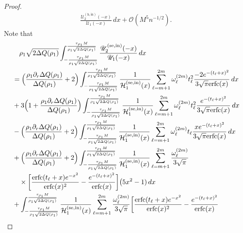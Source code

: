 \documentclass[a4paper]{article}
\newcommand{\erfc}{{\rm erfc}}
\numberwithin{equation}{section}
\begin{document}
\begin{proof}
\begin{align*}
\frac{\mathscr{U}_{2}^{(\mathrm{h},\mathrm{in})}(-x)}{\mathscr{U}_{1}(-x)}\,dx
+\mathcal{O}(M^5n^{-1/2}).
\end{align*}
Note that 
\begin{align*}
&\quad 
\rho_1\sqrt{2\Delta Q(\rho_1)}
\int_{-\frac{\tau_{\rho_1}M}{\rho_1\sqrt{2\Delta Q(\rho_1)}}}^{\frac{\tau_{\rho_1}M}{\rho_1\sqrt{2\Delta Q(\rho_1)}}}
\frac{\mathscr{U}_{2}^{(\mathrm{se},\mathrm{in})}(-x)}{\mathscr{U}_{1}(-x)}\,dx
\\
&=
\Bigl(\frac{\rho_1\partial_r\Delta Q(\rho_1)}{\Delta Q(\rho_1)}+2\Bigr)
\int_{-\frac{\tau_{\rho_1}M}{\rho_1\sqrt{2\Delta Q(\rho_1)}}}^{\frac{\tau_{\rho_1}M}{\rho_1\sqrt{2\Delta Q(\rho_1)}}}
\frac{1}{\mathcal{H}_1^{(\mathrm{se},\mathrm{in})}(x)}
\sum_{\ell=m+1}^{2m}\omega_{\ell}^{(2m)}t_{\ell}^2\frac{-2e^{-(t_{\ell}+x)^2}}{3\sqrt{\pi}\erfc(x)}
\,dx
\\
&
+
3\Bigl(1+\frac{\rho_1\partial_r\Delta Q(\rho_1)}{\Delta Q(\rho_1)}\Bigr)
\int_{-\frac{\tau_{\rho_1}M}{\rho_1\sqrt{2\Delta Q(\rho_1)}}}^{\frac{\tau_{\rho_1}M}{\rho_1\sqrt{2\Delta Q(\rho_1)}}}
\frac{1}{\mathcal{H}_1^{(\mathrm{se},\mathrm{in})}(x)}
\sum_{\ell=m+1}^{2m}\omega_{\ell}^{(2m)}t_{\ell}^2\frac{e^{-(t_{\ell}+x)^2}}{3\sqrt{\pi}\erfc(x)}
\,dx
\\
&
-%
\Bigl(\frac{\rho_1\partial_r\Delta Q(\rho_1)}{\Delta Q(\rho_1)}+2\Bigr)
\int_{-\frac{\tau_{\rho_1}M}{\rho_1\sqrt{2\Delta Q(\rho_1)}}}^{\frac{\tau_{\rho_1}M}{\rho_1\sqrt{2\Delta Q(\rho_1)}}}
\frac{1}{\mathcal{H}_1^{(\mathrm{se},\mathrm{in})}(x)}
\sum_{\ell=m+1}^{2m}\omega_{\ell}^{(2m)}t_{\ell}\frac{xe^{-(t_{\ell}+x)^2}}{3\sqrt{\pi}\erfc(x)}
\,dx
\\
&
+%
\Bigl(\frac{\rho_1\partial_r\Delta Q(\rho_1)}{\Delta Q(\rho_1)}+2\Bigr)
\int_{-\frac{\tau_{\rho_1}M}{\rho_1\sqrt{2\Delta Q(\rho_1)}}}^{\frac{\tau_{\rho_1}M}{\rho_1\sqrt{2\Delta Q(\rho_1)}}}
\frac{1}{\mathcal{H}_1^{(\mathrm{se},\mathrm{in})}(x)}
\sum_{\ell=m+1}^{2m}
\frac{\omega_{\ell}^{(2m)}}{3\sqrt{\pi}}
\\
&\quad\times\bigg[
\frac{\erfc(t_{\ell}+x)e^{-x^2}}{\erfc(x)^2}-\frac{e^{-(t_{\ell}+x)^2}}{\erfc(x)}
\bigg]
\bigl(5x^2-1)
\,dx
\\
&
+
\int_{-\frac{\tau_{\rho_1}M}{\rho_1\sqrt{2\Delta Q(\rho_1)}}}^{\frac{\tau_{\rho_1}M}{\rho_1\sqrt{2\Delta Q(\rho_1)}}}
\frac{1}{\mathcal{H}_1^{(\mathrm{se},\mathrm{in})}(x)}
\sum_{\ell=m+1}^{2m}
\frac{\omega_{\ell}^{(2m)}}{3\sqrt{\pi}}
\bigg[
\frac{\erfc(t_{\ell}+x)e^{-x^2}}{\erfc(x)^2}-\frac{e^{-(t_{\ell}+x)^2}}{\erfc(x)}

\end{align*}
\end{proof}
\end{document}
